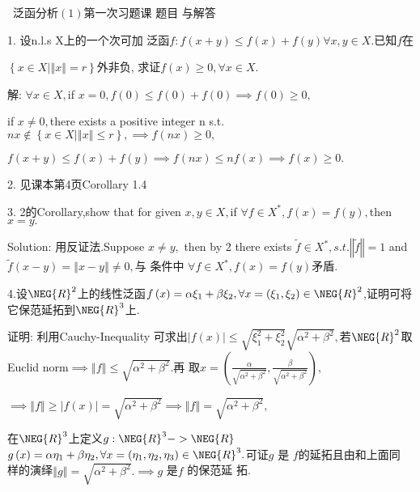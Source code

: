 \documentclass{article}
\begin{document}
\bigskip\ 
泛函分析$\left(
1\right) $第一次习题课 题目%
与解答

1. 设n.l.s X上的一个次可加%
泛函$f:f(x+y)\leq f\left( x\right) +f\left( y\right) \forall
x,y\in X.$已知$f$在

$\left\{ x\in X|\left\Vert x\right\Vert =r\right\} $外非负,%
求证$f\left( x\right) \geq 0,\forall x\in X.$

解: $\forall x\in X,$if $x=0,f\left( 0\right) \leq f\left( 0\right)
+f\left( 0\right) \implies f\left( 0\right) \geq 0,$

if $x\neq 0,$there exists a positive integer n s.t. $nx\notin \left\{ x\in
X|\left\Vert x\right\Vert \leq r\right\} ,\implies f\left( nx\right) \geq 0,$

$f(x+y)\leq f\left( x\right) +f\left( y\right) \implies f\left( nx\right)
\leq nf\left( x\right) \implies f\left( x\right) \geq 0.$

2. 见课本第4页Corollary 1.4

3. 2的Corollary,show that for given $x,y\in X,$if $\forall f\in
X^{\ast },f\left( x\right) =f\left( y\right) ,$then $x=y.$

Solution: 用反证法.Suppose $x\neq y,$ then by 2
there exists $\tilde{f}\in X^{\ast },s.t.\left\Vert \tilde{f}\right\Vert =1$
and $\tilde{f}\left( x-y\right) =\left\Vert x-y\right\Vert \neq 0,$与%
条件中 $\forall f\in X^{\ast },f\left( x\right) =f\left(
y\right) $矛盾.

4.设$\NEG{R}^{2}$上的线性泛函$%
f\left( x\right) =\alpha \xi _{1}+\beta \xi _{2},\forall x=\left( \xi
_{1},\xi _{2}\right) \in \NEG{R}^{2}$,证明可将%
它保范延拓到$\NEG{R}^{3}$上.

证明: 利用Cauchy-Inequality 可求出$%
\left\vert f\left( x\right) \right\vert \leq \sqrt{\xi _{1}^{2}+\xi _{2}^{2}}%
\sqrt{\alpha ^{2}+\beta ^{2}},$若$\NEG{R}^{2}$取Euclid norm$%
\implies \left\Vert f\right\Vert \leq \sqrt{\alpha ^{2}+\beta ^{2}}.$再%
取$x=\left( \frac{\alpha }{\sqrt{\alpha ^{2}+\beta ^{2}}},\frac{\beta 
}{\sqrt{\alpha ^{2}+\beta ^{2}}}\right) ,$

$\implies \left\Vert f\right\Vert \geq \left\vert f\left( x\right)
\right\vert =\sqrt{\alpha ^{2}+\beta ^{2}}\implies \left\Vert f\right\Vert =%
\sqrt{\alpha ^{2}+\beta ^{2}},$

在$\NEG{R}^{3}$上定义$g:\NEG{R}^{3}->\NEG{R}$ $%
g\left( x\right) =\alpha \eta _{1}+\beta \eta _{2},\forall x=\left( \eta
_{1},\eta _{2},\eta _{3}\right) \in \NEG{R}^{3}.$可证$g$ 是%
$f$的延拓且由和上面同%
样的演绎$\left\Vert g\right\Vert =\sqrt{\alpha
^{2}+\beta ^{2}}.\implies g$ 是$f$ 的保范延%
拓.
\end{document}
